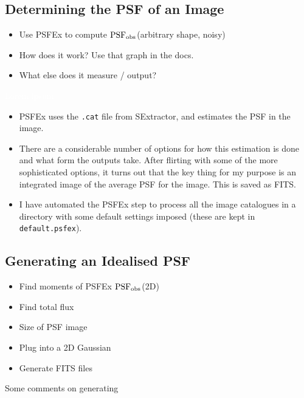 \documentclass[letterpaper, 11pt]{article}
\def\psfobs{\ensuremath{\rm PSF_{obs}}\xspace}
\def\wspace{\textcolor{white}{Lorem ipsum}}
\begin{document}
\subsection{Determining the PSF of an Image}
\label{sec:psfex}

\begin{itemize}
	\item Use PSFEx to compute \psfobs (arbitrary shape, noisy)
	\item How does it work? Use that graph in the docs.
	\item What else does it measure / output?
\end{itemize}

\wspace

\begin{itemize}
	\item PSFEx uses the \texttt{.cat} file from SExtractor, and estimates the PSF in the image.
	\item There are a considerable number of options for how this estimation is done and what form the outputs take. After flirting with some of the more sophisticated options, it turns out that the key thing for my purpose is an integrated image of the average PSF for the image. This is saved as FITS.
	\item I have automated the PSFEx step to process all the image catalogues in a directory with some default settings imposed (these are kept in \texttt{default.psfex}).
\end{itemize}

\subsection{Generating an Idealised PSF}

\begin{itemize}
	\item Find moments of PSFEx \psfobs (2D)
	\item Find total flux
	\item Size of PSF image
	\item Plug into a 2D Gaussian 
	\item Generate FITS files
\end{itemize}

Some comments on generating 
\end{document}
